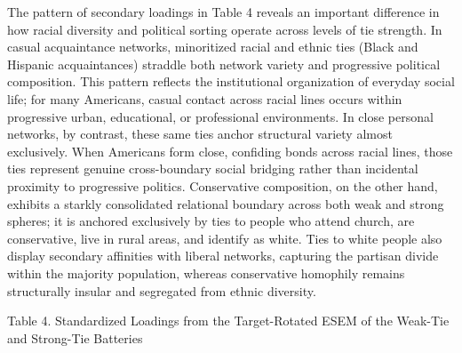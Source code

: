 \documentclass[
  12pt
]{article}
\begin{document}
The pattern of secondary loadings in Table 4 reveals an important difference in how racial diversity and political sorting operate across levels of tie strength. In casual acquaintance networks, minoritized racial and ethnic ties (Black and Hispanic acquaintances) straddle both network variety and progressive political composition. This pattern reflects the institutional organization of everyday social life; for many Americans, casual contact across racial lines occurs within progressive urban, educational, or professional environments. In close personal networks, by contrast, these same ties anchor structural variety almost exclusively. When Americans form close, confiding bonds across racial lines, those ties represent genuine cross-boundary social bridging rather than incidental proximity to progressive politics. Conservative composition, on the other hand, exhibits a starkly consolidated relational boundary across both weak and strong spheres; it is anchored exclusively by ties to people who attend church, are conservative, live in rural areas, and identify as white. Ties to white people also display secondary affinities with liberal networks, capturing the partisan divide within the majority population, whereas conservative homophily remains structurally insular and segregated from ethnic diversity.


Table 4. Standardized Loadings from the Target-Rotated ESEM of the Weak-Tie and Strong-Tie Batteries
\end{document}
